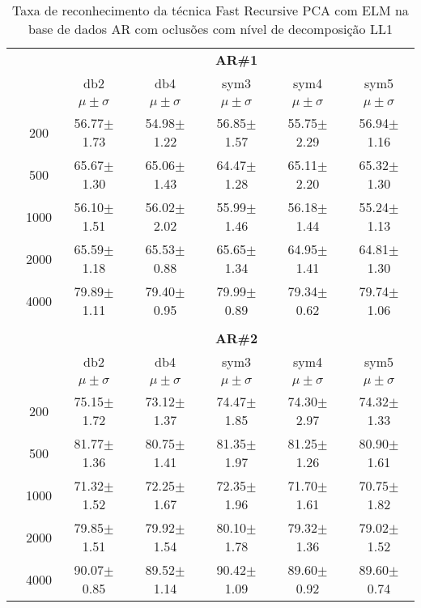 \begin{table}[H]
	\centering
    \normalsize
	\caption{Taxa de reconhecimento da técnica Fast Recursive PCA com ELM na base de dados AR com oclusões com nível de decomposição LL1}
   \hspace{0.5in}
	\begin{tabular}{|c|c|c c c c c|}
\cline{3-7}
\multicolumn{2}{c|}{\multirow{3}{*}{}} & \multicolumn{5}{c|}{\textbf{AR\#1}}   \\\cline{3-7} 
\multicolumn{2}{c|}{}  & db2 & db4 & sym3 & sym4 & sym5 \\\cline{3-7}%
\multicolumn{2}{c|}{}& $\mu \pm \sigma$ & $\mu \pm \sigma$ & $\mu \pm \sigma$ & $\mu \pm \sigma$ & $\mu \pm \sigma$ \\\hline


\multicolumn{1}{|c|}{ \multirow{5}{*}{\rotatebox[origin=c]{90}{\textbf{Neurônios}}} }
&200	&56.77$\pm$1.73	&54.98$\pm$1.22	&56.85$\pm$1.57	&55.75$\pm$2.29	&56.94$\pm$1.16\\\cline{2-7}
&500	&65.67$\pm$1.30	&65.06$\pm$1.43	&64.47$\pm$1.28	&65.11$\pm$2.20	&65.32$\pm$1.30\\\cline{2-7}
&1000	&56.10$\pm$1.51	&56.02$\pm$2.02 &55.99$\pm$1.46	&56.18$\pm$1.44	&55.24$\pm$1.13\\\cline{2-7}
&2000	&65.59$\pm$1.18	&65.53$\pm$0.88	&65.65$\pm$1.34	&64.95$\pm$1.41	&64.81$\pm$1.30\\\cline{2-7}
&4000	&79.89$\pm$1.11	&79.40$\pm$0.95	&79.99$\pm$0.89	&79.34$\pm$0.62	&79.74$\pm$1.06

\\\midrule%

\multicolumn{7}{c}{}\\ 

\cline{3-7}
\multicolumn{2}{c|}{\multirow{3}{*}{}} & \multicolumn{5}{c|}{\textbf{AR\#2}}   \\\cline{3-7} 

\multicolumn{2}{c|}{}  & db2 & db4 & sym3 & sym4 & sym5 \\\cline{3-7}
\multicolumn{2}{c|}{}& $\mu \pm \sigma$ & $\mu \pm \sigma$ & $\mu \pm \sigma$ & $\mu \pm \sigma$ & $\mu \pm \sigma$ \\\hline


\multicolumn{1}{|c|}{ \multirow{5}{*}{\rotatebox[origin=c]{90}{\textbf{Neurônios}}} }
&200	&75.15$\pm$1.72	&73.12$\pm$1.37	&74.47$\pm$1.85	&74.30$\pm$2.97	&74.32$\pm$1.33\\\cline{2-7}
&500	&81.77$\pm$1.36	&80.75$\pm$1.41	&81.35$\pm$1.97	&81.25$\pm$1.26	&80.90$\pm$1.61\\\cline{2-7}
&1000	&71.32$\pm$1.52	&72.25$\pm$1.67	&72.35$\pm$1.96	&71.70$\pm$1.61	&70.75$\pm$1.82\\\cline{2-7}
&2000	&79.85$\pm$1.51	&79.92$\pm$1.54	&80.10$\pm$1.78	&79.32$\pm$1.36 &79.02$\pm$1.52\\\cline{2-7}
&4000	&90.07$\pm$0.85	&89.52$\pm$1.14	&90.42$\pm$1.09	&89.60$\pm$0.92	&89.60$\pm$0.74


\end{tabular}
\end{table}
